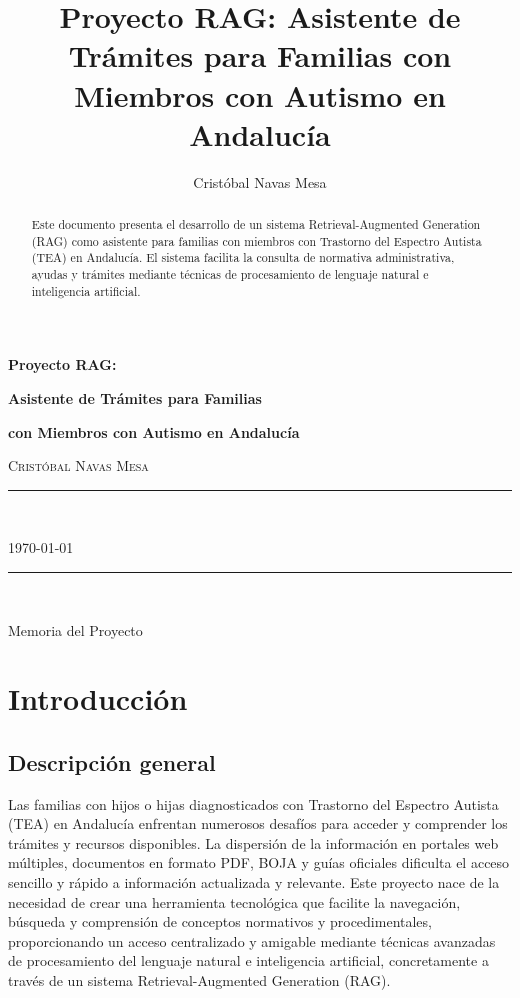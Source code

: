 \documentclass[a4paper,12pt]{article}
\title{Proyecto RAG: Asistente de Trámites para Familias con Miembros con Autismo en Andalucía}
\author{Cristóbal Navas Mesa}
\date{}
\begin{document}
\begin{titlepage}
    \centering
    \vspace*{1.5cm}
    {\bfseries\Huge Proyecto RAG: \par}
    {\bfseries\Huge Asistente de Trámites para Familias \par}
    {\bfseries\Huge con Miembros con Autismo en Andalucía \par}
    \vspace{2cm}
    {\Large \textsc{Cristóbal Navas Mesa} \par}
    \vspace{1cm}
    \rule{\linewidth}{0.5mm} \\[0.4cm]
    {\large \today \par}
    \rule{\linewidth}{0.5mm} \\[1.5cm]
    \vfill
    \large{Memoria del Proyecto\par}
    \vspace{0.5cm}
    \vfill
\end{titlepage}




\newpage

\begin{abstract}
Este documento presenta el desarrollo de un sistema Retrieval-Augmented Generation (RAG) como asistente para familias con miembros con Trastorno del Espectro Autista (TEA) en Andalucía. El sistema facilita la consulta de normativa administrativa, ayudas y trámites mediante técnicas de procesamiento de lenguaje natural e inteligencia artificial.
\end{abstract}

\newpage
\tableofcontents
\newpage

\section{Introducción}

\subsection{Descripción general}
Las familias con hijos o hijas diagnosticados con Trastorno del Espectro Autista (TEA) en Andalucía enfrentan numerosos desafíos para acceder y comprender los trámites y recursos disponibles. La dispersión de la información en portales web múltiples, documentos en formato PDF, BOJA y guías oficiales dificulta el acceso sencillo y rápido a información actualizada y relevante. Este proyecto nace de la necesidad de crear una herramienta tecnológica que facilite la navegación, búsqueda y comprensión de conceptos normativos y procedimentales, proporcionando un acceso centralizado y amigable mediante técnicas avanzadas de procesamiento del lenguaje natural e inteligencia artificial, concretamente a través de un sistema Retrieval-Augmented Generation (RAG).
\end{document}
